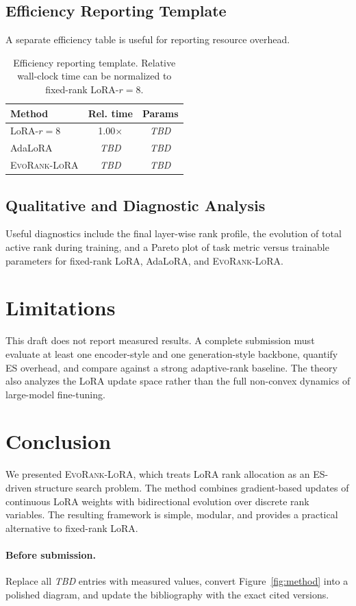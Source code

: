 \documentclass{article}
\newcommand{\method}{\textsc{EvoRank-LoRA}}
\newcommand{\TODO}{\textit{TBD}}
\begin{document}
\subsection{Efficiency Reporting Template}
A separate efficiency table is useful for reporting resource overhead.

\begin{table}[t]
    \centering
    \small
    \caption{Efficiency reporting template. Relative wall-clock time can be normalized to fixed-rank LoRA-$r=8$.}
    \label{tab:efficiency}
    \begin{tabularx}{\columnwidth}{>{\raggedright\arraybackslash}Xcc}
        \toprule
        Method & Rel. time & Params \\
        \midrule
        LoRA-$r=8$ & 1.00$\times$ & \TODO{} \\
        AdaLoRA & \TODO{} & \TODO{} \\
        \method & \TODO{} & \TODO{} \\
        \bottomrule
    \end{tabularx}
\end{table}

\subsection{Qualitative and Diagnostic Analysis}
Useful diagnostics include the final layer-wise rank profile, the evolution of total active rank during training, and a Pareto plot of task metric versus trainable parameters for fixed-rank LoRA, AdaLoRA, and \method.

\section{Limitations}
This draft does not report measured results. A complete submission must evaluate at least one encoder-style and one generation-style backbone, quantify ES overhead, and compare against a strong adaptive-rank baseline. The theory also analyzes the LoRA update space rather than the full non-convex dynamics of large-model fine-tuning.

\section{Conclusion}
We presented \method, which treats LoRA rank allocation as an ES-driven structure search problem. The method combines gradient-based updates of continuous LoRA weights with bidirectional evolution over discrete rank variables. The resulting framework is simple, modular, and provides a practical alternative to fixed-rank LoRA.

\paragraph{Before submission.}
Replace all \TODO{} entries with measured values, convert Figure~\ref{fig:method} into a polished diagram, and update the bibliography with the exact cited versions.



\end{document}
